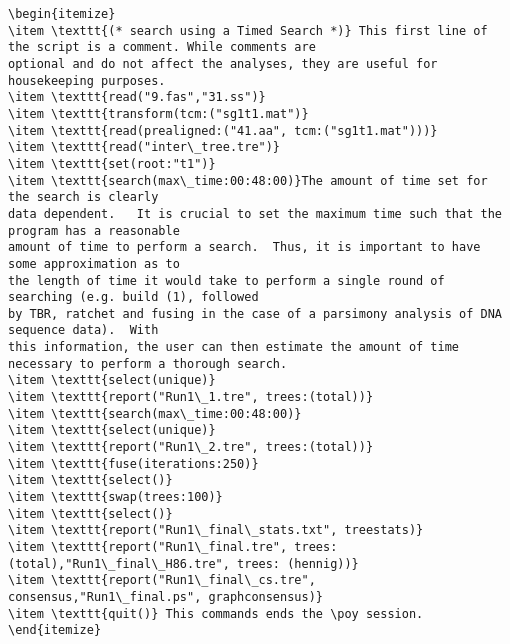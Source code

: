 \begin{verbatim}
\begin{itemize}
\item \texttt{(* search using a Timed Search *)} This first line of the script is a comment. While comments are 
optional and do not affect the analyses, they are useful for housekeeping purposes.
\item \texttt{read("9.fas","31.ss")}
\item \texttt{transform(tcm:("sg1t1.mat")}
\item \texttt{read(prealigned:("41.aa", tcm:("sg1t1.mat")))}
\item \texttt{read("inter\_tree.tre")}
\item \texttt{set(root:"t1")}
\item \texttt{search(max\_time:00:48:00)}The amount of time set for the search is clearly 
data dependent.   It is crucial to set the maximum time such that the program has a reasonable 
amount of time to perform a search.  Thus, it is important to have some approximation as to 
the length of time it would take to perform a single round of searching (e.g. build (1), followed 
by TBR, ratchet and fusing in the case of a parsimony analysis of DNA sequence data).  With 
this information, the user can then estimate the amount of time necessary to perform a thorough search. 
\item \texttt{select(unique)}
\item \texttt{report("Run1\_1.tre", trees:(total))}
\item \texttt{search(max\_time:00:48:00)}
\item \texttt{select(unique)}
\item \texttt{report("Run1\_2.tre", trees:(total))}
\item \texttt{fuse(iterations:250)}
\item \texttt{select()}
\item \texttt{swap(trees:100)}
\item \texttt{select()}
\item \texttt{report("Run1\_final\_stats.txt", treestats)}
\item \texttt{report("Run1\_final.tre", trees:(total),"Run1\_final\_H86.tre", trees: (hennig))}
\item \texttt{report("Run1\_final\_cs.tre", consensus,"Run1\_final.ps", graphconsensus)}
\item \texttt{quit()} This commands ends the \poy session.
\end{itemize}


\end{verbatim}
